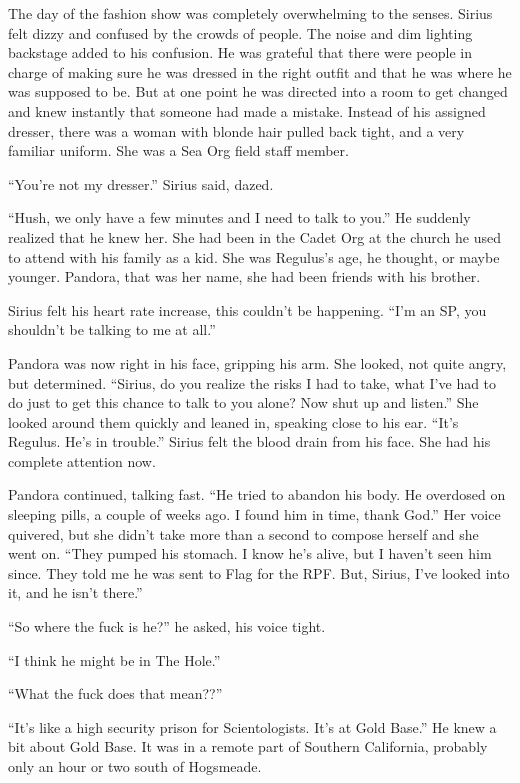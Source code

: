 \documentclass[12pt,twoside,openright]{memoir}
\begin{document}
The day of the fashion show was completely overwhelming to the senses. Sirius felt dizzy and confused by the crowds of people. The noise and dim lighting backstage added to his confusion. He was grateful that there were people in charge of making sure he was dressed in the right outfit and that he was where he was supposed to be. But at one point he was directed into a room to get changed and knew instantly that someone had made a mistake. Instead of his assigned dresser, there was a woman with blonde hair pulled back tight, and a very familiar uniform. She was a Sea Org field staff member. 

``You're not my dresser.'' Sirius said, dazed. 

``Hush, we only have a few minutes and I need to talk to you.'' He suddenly realized that he knew her. She had been in the Cadet Org at the church he used to attend with his family as a kid. She was Regulus's age, he thought, or maybe younger. Pandora, that was her name, she had been friends with his brother.

Sirius felt his heart rate increase, this couldn't be happening. ``I'm an SP, you shouldn't be talking to me at all.''

Pandora was now right in his face, gripping his arm. She looked, not quite angry, but determined. ``Sirius, do you realize the risks I had to take, what I've had to do just to get this chance to talk to you alone? Now shut up and listen.'' She looked around them quickly and leaned in, speaking close to his ear. ``It's Regulus. He's in trouble.''
Sirius felt the blood drain from his face. She had his complete attention now.

Pandora continued, talking fast. ``He tried to abandon his body. He overdosed on sleeping pills, a couple of weeks ago. I found him in time, thank God.'' Her voice quivered, but she didn't take more than a second to compose herself and she went on. ``They pumped his stomach. I know he's alive, but I haven't seen him since. They told me he was sent to Flag for the RPF. But, Sirius, I've looked into it, and he isn't there.''

``So where the fuck is he?'' he asked, his voice tight.

``I think he might be in The Hole.''

``What the fuck does that mean??''

``It's like a high security prison for Scientologists. It's at Gold Base.'' He knew a bit about Gold Base. It was in a remote part of Southern California, probably only an hour or two south of Hogsmeade.
\end{document}

